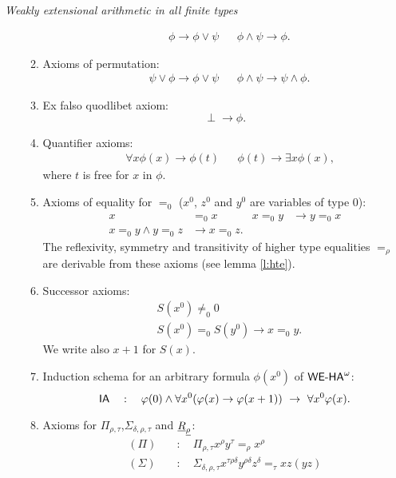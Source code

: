 \begin{dfn}{\em Weakly extensional arithmetic in all finite types }
\begin{itemize}
\begin{enumerate}
\begin{align*}
           &\phi\rightarrow\phi\vee\psi& 
           &\phi\wedge\psi\rightarrow\phi
           \text{.}
         \end{align*}
       \item Axioms of permutation:
         \begin{align*}
           &\psi\vee\phi\rightarrow\phi\vee\psi& 
           &\phi\wedge\psi\rightarrow\psi\wedge\phi
           \text{.}
         \end{align*}
       \item Ex falso quodlibet axiom:
         \[
           \perp\rightarrow\phi\text{.}
         \]
       \item Quantifier axioms:
         \begin{align*}
           &\forall x\phi(x)\rightarrow\phi(t)& 
           &\phi(t)\rightarrow\exists x\phi(x)
           \text{,}
         \end{align*}
           where $t$ is free for $x$ in $\phi$.
       \item Axioms of equality for $=_0$ ($x^0$, $z^0$ and $y^0$ are variables of type $0$):
         \begin{align*}
           x&=_0x&   x=_0y&\rightarrow y=_0x\\
           x=_0y\wedge y=_0z&\rightarrow x=_0z\text{.}&&
         \end{align*}
         The reflexivity, symmetry and transitivity of higher type equalities 
         $=_\rho$ are derivable from these axioms (see lemma \ref{l:hte}).
       \item Successor axioms:
         \begin{align*}
           &S(x^0)\neq_0 0\\
           &S(x^0)=_0S(y^0)\rightarrow x=_0y\text{.}
         \end{align*}
         We write also $x+1$ for $S(x)$.
       \item Induction schema for an arbitrary formula $\phi(x^0)$ of ${\textsf{\upshape WE-HA}}^{\omega}$:
         \[ \IA \quad:\quad \phi(0)\wedge\forall x^0(\phi(x)\rightarrow\phi(x+1))\ 
             \rightarrow\ \forall x^0\phi(x) \text{.}\]
       \item Axioms for $\Pi_{\rho, \tau}$,$\Sigma_{\delta, \rho, \tau}$ 
         and $\underline R_{\underline \rho}$:
         \begin{align*}
         (\Pi)\quad&:\quad \Pi_{\rho,\tau}x^{\rho}y^{\tau} =_{\rho}x^{\rho}\\ 
         (\Sigma)\quad&:\quad \Sigma_{\delta, \rho, \tau}
           x^{\tau \rho\delta}y^{\rho\delta}z^{\delta} =_{\tau} xz(yz)\\

\end{align*}
\end{enumerate}
\end{itemize}
\end{dfn}
